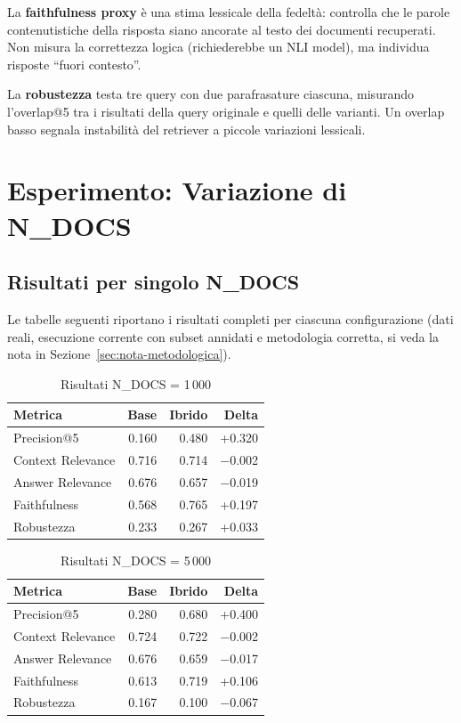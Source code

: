 \documentclass[12pt,a4paper]{article}
\begin{document}
La \textbf{faithfulness proxy} \`e una stima lessicale della fedelt\`a: controlla che le parole contenutistiche della risposta siano ancorate al testo dei documenti recuperati. Non misura la correttezza logica (richiederebbe un NLI model), ma individua risposte ``fuori contesto''.

La \textbf{robustezza} testa tre query con due parafrasature ciascuna, misurando l'overlap@5 tra i risultati della query originale e quelli delle varianti. Un overlap basso segnala instabilit\`a del retriever a piccole variazioni lessicali.

\section{Esperimento: Variazione di N\_DOCS}

\subsection{Risultati per singolo N\_DOCS}

Le tabelle seguenti riportano i risultati completi per ciascuna configurazione (dati reali, esecuzione corrente con subset annidati e metodologia corretta, si veda la nota in Sezione~\ref{sec:nota-metodologica}).

\begin{table}[H]
  \centering
  \caption{Risultati N\_DOCS = 1\,000}
  \begin{tabular}{lrrr}
    \toprule
    \textbf{Metrica} & \textbf{Base} & \textbf{Ibrido} & \textbf{Delta} \\
    \midrule
    Precision@5        & 0.160 & 0.480 & +0.320 \\
    Context Relevance  & 0.716 & 0.714 & $-$0.002 \\
    Answer Relevance   & 0.676 & 0.657 & $-$0.019 \\
    Faithfulness       & 0.568 & 0.765 & +0.197 \\
    Robustezza         & 0.233 & 0.267 & +0.033 \\
    \bottomrule
  \end{tabular}
\end{table}

\begin{table}[H]
  \centering
  \caption{Risultati N\_DOCS = 5\,000}
  \begin{tabular}{lrrr}
    \toprule
    \textbf{Metrica} & \textbf{Base} & \textbf{Ibrido} & \textbf{Delta} \\
    \midrule
    Precision@5        & 0.280 & 0.680 & +0.400 \\
    Context Relevance  & 0.724 & 0.722 & $-$0.002 \\
    Answer Relevance   & 0.676 & 0.659 & $-$0.017 \\
    Faithfulness       & 0.613 & 0.719 & +0.106 \\
    Robustezza         & 0.167 & 0.100 & $-$0.067 \\
    \bottomrule
  \end{tabular}
\end{table}
\end{document}
